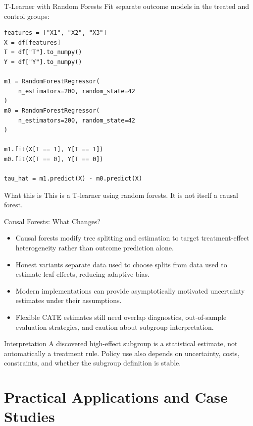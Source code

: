 \documentclass[aspectratio=169,11pt]{beamer}
\begin{document}
\begin{frame}[fragile]{T-Learner with Random Forests}
Fit separate outcome models in the treated and control groups:

\begin{lstlisting}[style=code,basicstyle=\ttfamily\small]
features = ["X1", "X2", "X3"]
X = df[features]
T = df["T"].to_numpy()
Y = df["Y"].to_numpy()

m1 = RandomForestRegressor(
    n_estimators=200, random_state=42
)
m0 = RandomForestRegressor(
    n_estimators=200, random_state=42
)

m1.fit(X[T == 1], Y[T == 1])
m0.fit(X[T == 0], Y[T == 0])

tau_hat = m1.predict(X) - m0.predict(X)
\end{lstlisting}

\begin{alertblock}{What this is}
This is a T-learner using random forests. It is not itself a causal forest.
\end{alertblock}
\end{frame}

\begin{frame}{Causal Forests: What Changes?}
\begin{itemize}
  \item Causal forests modify tree splitting and estimation to target treatment-effect heterogeneity rather than outcome prediction alone.
  \item Honest variants separate data used to choose splits from data used to estimate leaf effects, reducing adaptive bias.
  \item Modern implementations can provide asymptotically motivated uncertainty estimates under their assumptions.
  \item Flexible CATE estimates still need overlap diagnostics, out-of-sample evaluation strategies, and caution about subgroup interpretation.
\end{itemize}

\begin{block}{Interpretation}
A discovered high-effect subgroup is a statistical estimate, not automatically a treatment rule. Policy use also depends on uncertainty, costs, constraints, and whether the subgroup definition is stable.
\end{block}
\end{frame}

\section{Practical Applications and Case Studies}
\end{document}
